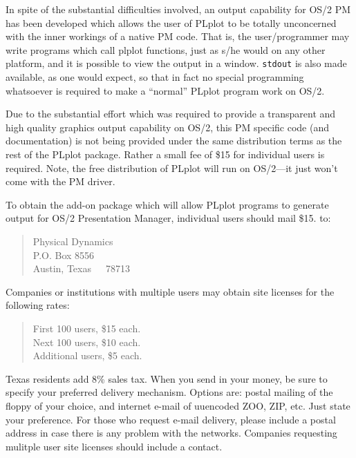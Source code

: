 In spite of the substantial difficulties involved, an output capability for
OS/2 PM has been developed which allows the user of PLplot to be totally
unconcerned with the inner workings of a native PM code.  That is, the 
user/programmer may write programs which call plplot functions, just as
s/he would on any other platform, and it is possible to view the output
in a window.  {\tt stdout} is also made available, as one would expect,
so that in fact no special programming whatsoever is required to make
a ``normal'' PLplot program work on OS/2.  

Due to the substantial effort which was required to provide a transparent
and high quality graphics output capability on OS/2, this PM specific
code (and documentation) is not being provided under the same distribution
terms as the rest of the PLplot package.  Rather a small fee of \$15 for
individual users is required.  Note, the free distribution of PLplot will 
run on OS/2---it just won't come with the PM driver.

To obtain the add-on package which will allow PLplot programs to generate
output for OS/2 Presentation Manager, individual users should mail \$15. to:
\begin{quote}
Physical Dynamics \\
P.O. Box 8556 \\
Austin, Texas~~~78713 \\
\end{quote}
Companies or institutions with multiple users may obtain site licenses for
the following rates:
\begin{quote}
First 100 users, \$15 each. \\
Next 100 users, \$10 each.  \\
Additional users, \$5 each. \\
\end{quote}
Texas residents add 8\% sales tax.  When you send in your money, be sure 
to specify your preferred delivery mechanism.  Options are: postal mailing
of the floppy of your choice, and internet e-mail of uuencoded ZOO, ZIP, 
etc.  Just
state your preference.  For those who request e-mail delivery, please include
a postal address in case there is any problem with the networks.
Companies requesting mulitple user site licenses should include a contact.

